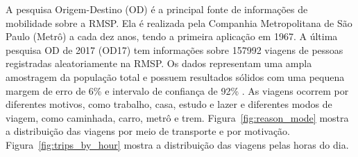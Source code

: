 A pesquisa Origem-Destino (OD) é a principal fonte de informações de mobilidade
sobre a RMSP. Ela é realizada pela Companhia Metropolitana de São Paulo (Metrô) a cada
dez anos, tendo a primeira aplicação em 1967. A última pesquisa OD de 2017 (OD17) tem informações sobre
\num{157992} viagens de pessoas registradas aleatoriamente na RMSP. Os dados representam
uma ampla amostragem da população total e possuem resultados sólidos com uma pequena
margem de erro de 6\% e intervalo de confiança de 92\% \cite[p.18]{odmanual:17}. As viagens ocorrem por diferentes motivos, como
trabalho, casa, estudo e lazer e diferentes modos de viagem, como caminhada,
carro, metrô e trem. Figura~\ref{fig:reason_mode} mostra a distribuição das viagens por meio de
transporte e por motivação. Figura~\ref{fig:trips_by_hour} mostra a distribuição das viagens pelas
horas do dia.

